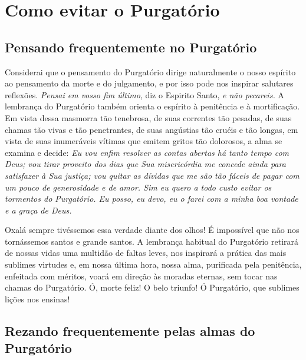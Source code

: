\renewcommand{\thechapterdisplay}{Vigésimo oitavo dia}
\renewcommand{\thechapterrunner}{Como evitar o Purgatório}
\chapter[Vigésimo oitavo dia --- Como evitar o Purgatório]{Como evitar o Purgatório}
\section*{Pensando frequentemente no Purgatório}

Considerai que o pensamento do Purgatório dirige naturalmente o nosso espírito ao pensamento da morte e do julgamento, e por isso pode nos inspirar salutares reflexões. \textit{Pensai em vosso fim último}, diz o Espirito Santo, \textit{e não pecareis.} A lembrança do Purgatório também orienta o espírito à penitência e à mortificação. Em vista dessa masmorra tão tenebrosa, de suas correntes tão pesadas, de suas chamas tão vivas e tão penetrantes, de suas angústias tão cruéis e tão longas, em vista de suas inumeráveis vítimas que emitem gritos tão dolorosos, a alma se examina e decide: \textit{Eu vou enfim resolver as contas abertas há tanto tempo com Deus; vou tirar proveito dos dias que Sua misericórdia me concede ainda para satisfazer à Sua justiça; vou quitar as dívidas que me são tão fáceis de pagar com um pouco de generosidade e de amor. Sim eu quero a todo custo evitar os tormentos do Purgatório. Eu posso, eu devo, eu o farei com a minha boa vontade e a graça de Deus.}

Oxalá sempre tivéssemos essa verdade diante dos olhos! É impossível que não nos tornássemos santos e grande santos. A lembrança habitual do Purgatório retirará de nossas vidas uma multidão de faltas leves, nos inspirará a prática das mais sublimes virtudes e, em nossa última hora, nossa alma, purificada pela penitência, enfeitada com méritos, voará em direção às moradas eternas, sem tocar nas chamas do Purgatório. Ó, morte feliz! O belo triunfo! Ó Purgatório, que sublimes lições nos ensinas!

\section*{Rezando frequentemente pelas almas do Purgatório}

